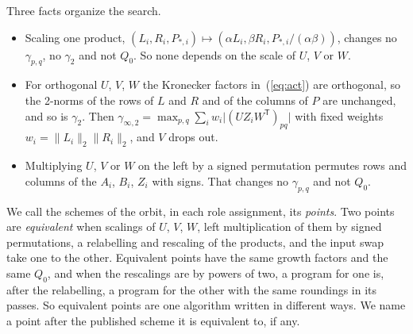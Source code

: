 \documentclass[11pt]{article}
\theoremstyle{remark}
\newcommand{\ginf}{\gamma_{\infty,2}}
\begin{document}
Three facts organize the search.
\begin{itemize}
\item Scaling one product, $(L_i,R_i,P_{*,i})\mapsto(\alpha L_i,\beta
  R_i,P_{*,i}/(\alpha\beta))$, changes no $\gamma_{p,q}$, no $\gamma_2$
  and not $Q_0$.  So none depends on the scale of $U$, $V$ or $W$.
\item For orthogonal $U$, $V$, $W$ the Kronecker factors
  in~(\ref{eq:act}) are orthogonal, so the 2-norms of the rows of $L$
  and $R$ and of the columns of $P$ are unchanged, and so is $\gamma_2$.
  Then $\ginf=\max_{p,q}\sum_i w_i\lvert(UZ_iW^{\mathsf T})_{pq}\rvert$
  with fixed weights $w_i=\lVert L_i\rVert_2\lVert R_i\rVert_2$, and $V$
  drops out.
\item Multiplying $U$, $V$ or $W$ on the left by a signed permutation
  permutes rows and columns of the $A_i$, $B_i$, $Z_i$ with signs.  That
  changes no $\gamma_{p,q}$ and not $Q_0$.
\end{itemize}
We call the schemes of the orbit, in each role assignment, its
\emph{points}.  Two points are \emph{equivalent} when scalings of $U$,
$V$, $W$, left multiplication of them by signed permutations, a
relabelling and rescaling of the products, and the input swap take one
to the other.  Equivalent points have the same growth factors and the
same $Q_0$, and when the rescalings are by powers of two, a program for
one is, after the relabelling, a program for the other with the same
roundings in its passes.  So equivalent points are one algorithm written
in different ways.  We name a point after the published scheme it is
equivalent to, if any.
\end{document}
